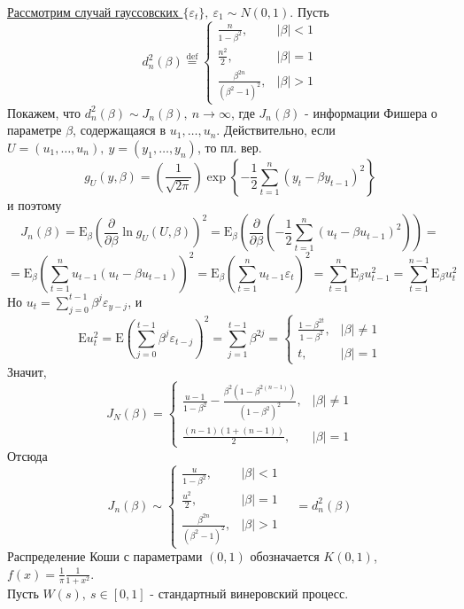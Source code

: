\documentclass[12pt]{article}
\newcommand*{\defeq}{\stackrel{\text{def}}{=}}
\def\eps{ \varepsilon }
\def\E{ \mathrm{E} }
\begin{document}
\underline{Рассмотрим случай гауссовских $\{\eps_t\},\ \eps_1\sim N(0,1)$}. Пусть
\[d_n^2(\beta)\defeq\begin{cases}
    \frac{n}{1-\beta^2},& \left\lvert \beta\right\rvert <1 \\
    \frac{n^2}{2},& \left\lvert \beta\right\rvert =1 \\
    \frac{\beta^{2n}}{(\beta^2-1)^2},& \left\lvert \beta\right\rvert >1
\end{cases}\]
Покажем, что $d_n^2(\beta)\sim J_n(\beta),\ n\rightarrow\infty$,
где $J_n(\beta)$ - информации Фишера о параметре $\beta$,
содержащаяся в $u_1,\ldots,u_n$. Действительно,
если $U=(u_1,\ldots,u_n),\ y=(y_1,\ldots,y_n)$, то пл. вер.
\[g_U(y,\beta)=\left(\frac{1}{\sqrt{2\pi}}\right)\exp{\left\{-\frac{1}{2}\sum_{t=1}^n(y_t-\beta y_{t-1})^2\right\}}\]
и поэтому
\[J_n(\beta)=\E_{\beta}\left(\frac{\partial}{\partial\beta}\ln g_U(U,\beta)\right)^2=\E_\beta\left(\frac{\partial}{\partial\beta}\left(-\frac{1}{2}\sum_{t=1}^n(u_t-\beta u_{t-1})^2\right)\right)=\]
\[=\E_\beta\left(\sum_{t=1}^nu_{t-1}(u_t-\beta u_{t-1})\right)^2=\E_\beta\left(\sum_{t=1}^nu_{t-1}\eps_t\right)^2=\sum_{t=1}^n\E_\beta u^2_{t-1}=\sum_{t=1}^{n-1}\E_\beta u^2_{t}\]
Но $u_t=\sum_{j=0}^{t-1}\beta^j\eps_{y-j}$, и
\[\E u_t^2=\E(\sum_{j=0}^{t-1}\beta^j\eps_{t-j})^2=\sum_{j=1}^{t-1}\beta^{2j}=\begin{cases}
    \frac{1-\beta^{2t}}{1-\beta^2},& \left\lvert \beta\right\rvert \neq1 \\
    t,& \left\lvert \beta\right\rvert =1
\end{cases}\]
Значит,
\[J_N(\beta)=\begin{cases}
    \frac{u-1}{1-\beta^2}-\frac{\beta^2(1-\beta^{2(n-1)})}{(1-\beta^2)^2},& \left\lvert \beta\right\rvert \neq1\\
    \frac{(n-1)(1+(n-1))}{2},& \left\lvert \beta\right\rvert  =1
\end{cases}\]
Отсюда
\[
    J_n(\beta)\sim\begin{cases}
        \frac{u}{1-\beta^2},& \left\lvert \beta\right\rvert <1 \\
        \frac{u^2}{2},& \left\lvert \beta\right\rvert =1 \\
        \frac{\beta^{2n}}{(\beta^2-1)^2},& \left\lvert \beta\right\rvert >1
    \end{cases}
    \quad =d^2_n(\beta)
\]
Распределение Коши с параметрами $(0,1)$ обозначается $K(0,1)$, $f(x)=\frac{1}{\pi}\frac{1}{1+x^2}$. \\
Пусть $W(s),\ s\in[0,1]$ - стандартный винеровский процесс.
\end{document}
